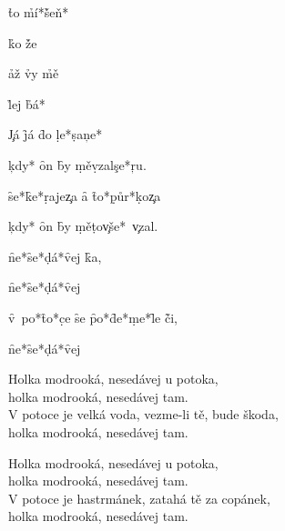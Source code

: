    
 \h{to} \h{mí*}\h{šeň*} 

   
\h{ko} \h{že} 

 \h{až} \h{vy} \h{mě} 
    

    
\h{lej} \h{bá*}



{\minw=4.5mm \punit=1.5mm

\c{Já}  \pp{}\p {}\pp{}\p
\f{já} \f{do} \d{le*}\pp\d{sa}\p \c{ne*}

\c{kdy*} \p {}\p {} \pp{}\p
\f{on} \f{by} \d{mě}\p \d{vzal}\p \c{se*}\c{ru.}

\f{se*}\f{ke*}\d{ra}\p \d{je}\p \c{za}  \pp{}\p
\f{a} \f{to*}\d{půr*}\pp\d{ko}\p \c{za} 

\c{kdy*} \p {}\p {} \pp{}\p
\f{on} \f{by} \d{mě}\p \d{to}\p \c{vše*}~\c{vzal.}}



\pp{}\p {}
\f{ne*}\f{se*}\d{dá*}\f{vej}  \f{ka,}

\pp{}\p {}
\f{ne*}\f{se*}\d{dá*}\f{vej} 

\f{v~po*}\f{to*}\d{ce} \f{se}  
\f{po*}\f{de*}\d{me*}\f{le}  \f{či,}

\pp{}\p {}
\f{ne*}\f{se*}\d{dá*}\f{vej} 

Holka modrooká, nesedávej u potoka,\\
holka modrooká, nesedávej tam.\\
V potoce je velká voda, vezme-li tě, bude škoda,\\
holka modrooká, nesedávej tam.

Holka modrooká, nesedávej u potoka,\\
holka modrooká, nesedávej tam.\\
V potoce je hastrmánek, zatahá tě za copánek,\\
holka modrooká, nesedávej tam.

\bye
